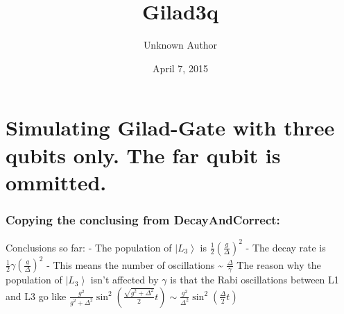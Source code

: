 \documentclass[letterpaper,10pt,english]{/usr/share/sphinx/texinputs/sphinxhowto}
\title{Gilad3q}
\date{April 7, 2015}
\author{Unknown Author}
\begin{document}
        
            \maketitle
        

        


        
        \part{Simulating Gilad-Gate with three qubits only. The far qubit is ommitted.}\section{Copying the conclusing from DecayAndCorrect:}Conclusions so far: - The population of $\left|L_3\right>$ is
$\frac{1}{2}\left(\frac{g}{\Delta}\right)^2$ - The decay rate is
$\frac{1}{2}\gamma\left(\frac{g}{\Delta}\right)^2$ - This means the
number of oscillations \textasciitilde{} $\frac{\Delta}{\gamma}$ The
reason why the population of $\left|L_3\right>$ isn't affected by
$\gamma$ is that the Rabi oscillations between L1 and L3 go like
$\frac{g^{2}}{g^{2}+\Delta^{2}}\sin^{2}\left(\frac{\sqrt{g^{2}+\Delta^{2}}}{2}t\right)\sim\frac{g^{2}}{\Delta^{2}}\sin^{2}\left(\frac{\Delta}{2}t\right)$
\end{document}
